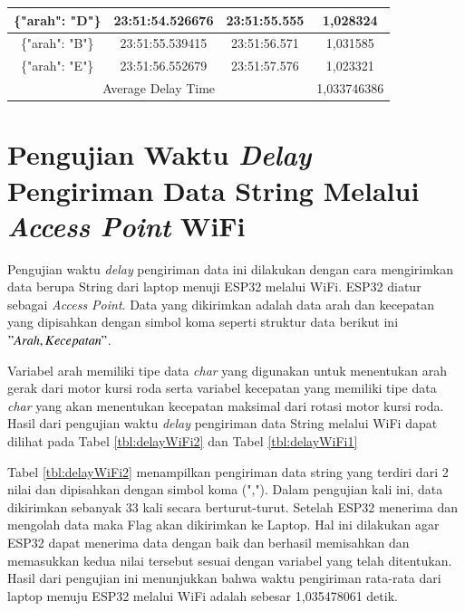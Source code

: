 \begin{table}[htpb]
\begin{tabular}{|ccc|c|}
  \multicolumn{1}{|c|}{\{"arah": "D"\}} & \multicolumn{1}{c|}{23:51:54.526676} & 23:51:55.555       & 1,028324    \\ \hline
  \multicolumn{1}{|c|}{\{"arah": "B"\}} & \multicolumn{1}{c|}{23:51:55.539415} & 23:51:56.571       & 1,031585    \\ \hline
  \multicolumn{1}{|c|}{\{"arah": "E"\}} & \multicolumn{1}{c|}{23:51:56.552679} & 23:51:57.576       & 1,023321    \\ \hline
  \multicolumn{3}{|c|}{Average Delay Time}                                                          & 1,033746386 \\ \hline
  \end{tabular}
\end{table}

\newpage

\section{Pengujian Waktu \emph{Delay} Pengiriman Data String Melalui \emph{Access Point} WiFi}
\label{sec:delayWiFi}

Pengujian waktu \emph{delay} pengiriman data ini dilakukan dengan cara mengirimkan data berupa String dari laptop menuji ESP32 melalui WiFi. ESP32 diatur sebagai \emph{Access Point}. Data yang dikirimkan adalah data arah dan kecepatan yang dipisahkan dengan simbol koma seperti struktur data berikut ini \("Arah, Kecepatan"\).

Variabel arah memiliki tipe data \emph{char} yang digunakan untuk menentukan arah gerak dari motor kursi roda serta variabel kecepatan yang memiliki tipe data \emph{char} yang akan menentukan kecepatan maksimal dari rotasi motor kursi roda. Hasil dari pengujian waktu \emph{delay} pengiriman data String melalui WiFi dapat dilihat pada Tabel \ref{tbl:delayWiFi2} dan Tabel \ref{tbl:delayWiFi1}

Tabel \ref{tbl:delayWiFi2} menampilkan pengiriman data string yang terdiri dari 2 nilai dan dipisahkan dengan simbol koma (","). Dalam pengujian kali ini, data dikirimkan sebanyak 33 kali secara berturut-turut. Setelah ESP32 menerima dan mengolah data maka Flag akan dikirimkan ke Laptop. Hal ini dilakukan agar ESP32 dapat menerima data dengan baik dan berhasil memisahkan dan memasukkan kedua nilai tersebut sesuai dengan variabel yang telah ditentukan. Hasil dari pengujian ini menunjukkan bahwa waktu pengiriman rata-rata dari laptop menuju ESP32 melalui WiFi adalah sebesar 1,035478061 detik.

